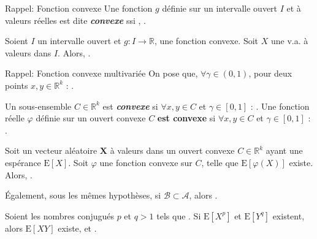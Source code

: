 \documentclass[10pt, french]{report}
\begin{document}
\begin{multicols*}{2}
\begin{definitionNOHFILL}
\begin{rappel}{Rappel: Fonction convexe}
Une fonction $g$ définie sur un intervalle ouvert $I$ et à valeurs réelles est dite \textbf{\textit{convexe}} ssi , .
\end{rappel}

Soient $I$ un intervalle ouvert et $g : I \rightarrow \mathbb{R}$, une fonction convexe. Soit $X$ une v.a. à valeurs dans $I$. Alors, .
\end{definitionNOHFILL}


\begin{definitionNOHFILL}
\begin{rappel}{Rappel: Fonction convexe multivariée}
On pose que, $\forall \gamma \in (0, 1)$, pour deux points $x, y \in \mathbb{R}^{k}$ : . 

\bigskip

Un sous-ensemble $C \in \mathbb{R}^{k}$ est \textbf{\textit{convexe}} si $\forall x, y \in C$ et $\gamma \in [0, 1]$ : . Une fonction réelle $\varphi$ définie sur un ouvert convexe $C$ \textbf{est convexe} si $\forall x, y \in C$ et $\gamma \in [0, 1]$ : .
\end{rappel}

Soit un vecteur aléatoire $\bm{X}$ à valeurs dans un ouvert convexe $C \in \mathbb{R}^{k}$ ayant une espérance $\text{E}[X]$. Soit $\varphi$ une fonction convexe sur $C$, telle que $\text{E}[\varphi(X)]$ existe. Alors, .

\bigskip

Également, sous les mêmes hypothèses, si $\mathcal{B} \subset \mathcal{A}$, alors .
\end{definitionNOHFILL}

\begin{definitionNOHFILL}
Soient les nombres conjugués $p$ et $q > 1$ tels que . Si $\text{E}[X^{p}]$ et $\text{E}[Y^{q}]$ existent, alors $\text{E}[XY]	$ existe, et .


\end{definitionNOHFILL}
\end{multicols*}
\end{document}
